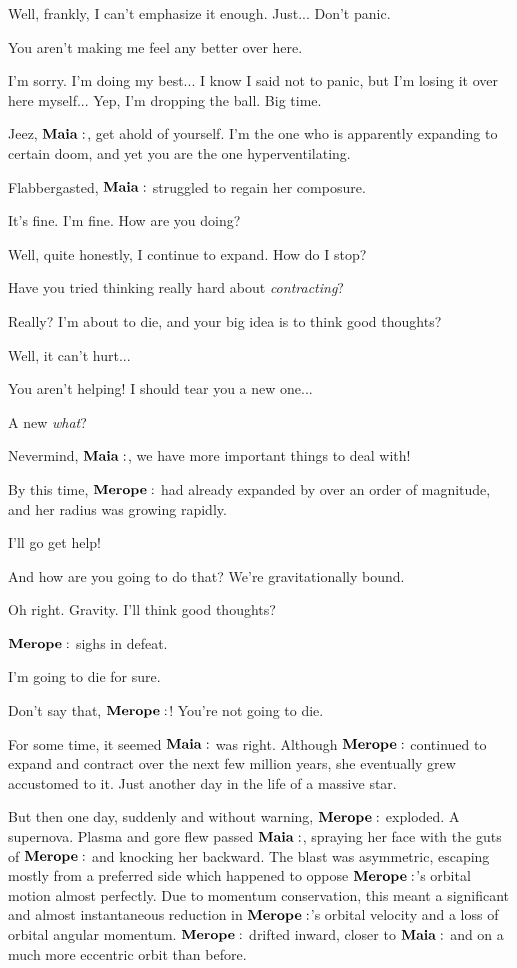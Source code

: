 \documentclass[main.tex]{subfiles}
\begin{document}
\Maia Well, frankly, I can't emphasize it enough.  Just... Don't panic.

\Merope You aren't making me feel any better over here.

\Maia I'm sorry.  I'm doing my best... I know I said not to panic, but I'm losing it over here myself...  Yep, I'm dropping the ball.  Big time.

\Meropa  Jeez, $\Maia$, get ahold of yourself.  I'm the one who is apparently expanding to certain doom, and yet you are the one hyperventilating.

Flabbergasted, $\Maia$ struggled to regain her composure.

\Maia It's fine.  I'm fine.  How are you doing?

\Merope Well, quite honestly, I continue to expand.  How do I stop?

\Maia Have you tried thinking really hard about \textit{contracting}?

\Merope Really?  I'm about to die, and your big idea is to think good thoughts?  

\Maia Well, it can't hurt...

\Merope You aren't helping!  I should tear you a new one...

\Maia A new \textit{what}?

\Merope Nevermind, $\Maia$, we have more important things to deal with!

By this time, $\Merope$ had already expanded by over an order of magnitude, and her radius was growing rapidly.  

\Maia I'll go get help!

\Merope And how are you going to do that?  We're gravitationally bound.

\Maia Oh right.  Gravity.  I'll think good thoughts?

$\Merope$ sighs in defeat.

\Merope I'm going to die for sure.

\Maia Don't say that, $\Merope$!  You're not going to die.

For some time, it seemed $\Maia$ was right.  Although $\Merope$ continued to expand and contract over the next few million years, she eventually grew accustomed to it.  Just another day in the life of a massive star.

But then one day, suddenly and without warning, $\Merope$ exploded.  A supernova.  Plasma and gore flew passed $\Maia$, spraying her face with the guts of $\Merope$ and knocking her backward.  The blast was asymmetric, escaping mostly from a preferred side which happened to oppose $\Merope$'s orbital motion almost perfectly.  Due to momentum conservation, this meant a significant and almost instantaneous reduction in $\Merope$'s orbital velocity and a loss of orbital angular momentum.  $\Merope$ drifted inward, closer to $\Maia$ and on a much more eccentric orbit than before.  
\end{document}
